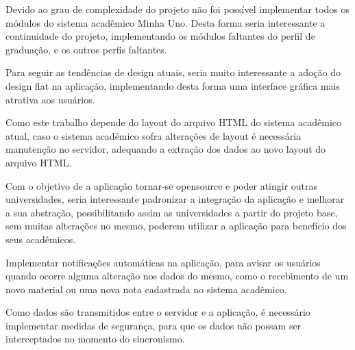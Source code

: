 Devido ao grau de complexidade do projeto não foi possível implementar todos os módulos do sistema acadêmico Minha Uno. Desta forma seria interessante a continuidade do projeto, implementando os módulos faltantes do perfil de graduação, e os outros perfis faltantes.

Para seguir as tendências de design atuais, seria muito interessante a adoção do design flat na aplicação, implementando desta forma uma interface gráfica mais atrativa aos usuários.

Como este trabalho depende do layout do arquivo HTML do sistema acadêmico atual, caso o sistema acadêmico sofra alterações de layout é necessária manutenção no servidor, adequando a extração dos dados ao novo layout do arquivo HTML.

Com o objetivo de a aplicação tornar-se opensource e poder atingir outras universidades, seria interessante padronizar a integração da aplicação e melhorar a sua abstração, possibilitando assim as universidades a partir do projeto base, sem muitas alterações no mesmo, poderem utilizar a aplicação para benefício dos seus acadêmicos.

Implementar notificações automáticas na aplicação, para avisar os usuários quando ocorre alguma alteração nos dados do mesmo, como o recebimento de um novo material ou uma nova nota cadastrada no sistema acadêmico.

Como dados são transmitidos entre o servidor e a aplicação, é necessário implementar medidas de segurança, para que os dados não possam ser interceptados no momento do sincronismo.